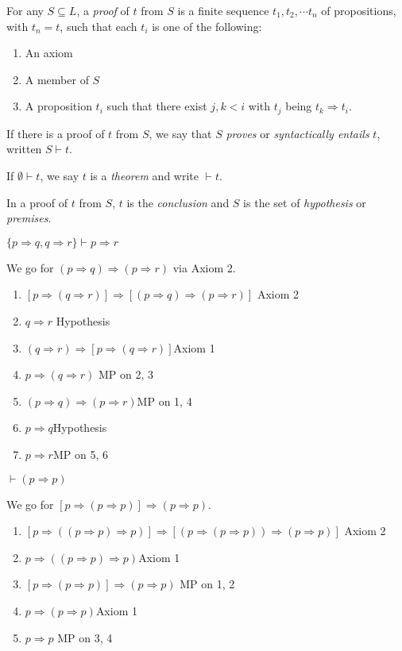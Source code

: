 \documentclass[a4paper]{article}
\begin{document}
\begin{defi}
  For any $S\subseteq L$, a \emph{proof} of $t$ from $S$ is a finite sequence $t_1, t_2, \cdots t_n$ of propositions, with $t_n = t$, such that each $t_i$ is one of the following:
\begin{enumerate}
  \item An axiom
  \item A member of $S$
  \item A proposition $t_i$ such that there exist $j, k < i$ with $t_j$ being $t_k\Rightarrow t_i$.
\end{enumerate}
If there is a proof of $t$ from $S$, we say that $S$ \emph{proves} or \emph{syntactically entails} $t$, written $S\vdash t$.

If $\emptyset \vdash t$, we say $t$ is a \emph{theorem} and write $\vdash t$.

In a proof of $t$ from $S$, $t$ is the \emph{conclusion} and $S$ is the set of \emph{hypothesis} or \emph{premises}.

\end{defi}
\begin{eg}
  $\{p\Rightarrow q, q\Rightarrow r\} \vdash p\Rightarrow r$

  We go for $(p\Rightarrow  q)\Rightarrow  (p\Rightarrow  r)$ via Axiom 2.
  \begin{enumerate}[label=\arabic{*}.]
    \item $[p\Rightarrow (q\Rightarrow r)]\Rightarrow [(p\Rightarrow q) \Rightarrow (p\Rightarrow r)]$ \hfill Axiom 2
    \item $q\Rightarrow r$ \hfill Hypothesis
    \item $(q\Rightarrow r)\Rightarrow [p\Rightarrow (q\Rightarrow r)]$\hfill Axiom 1
    \item $p\Rightarrow (q\Rightarrow r)$ \hfill MP on 2, 3
    \item $(p\Rightarrow q)\Rightarrow (p\Rightarrow r)$\hfill MP on 1, 4
    \item $p\Rightarrow q$\hfill Hypothesis
    \item $p\Rightarrow r$\hfill MP on 5, 6
  \end{enumerate}
\end{eg}

\begin{eg}
  $\vdash (p\Rightarrow p)$

  We go for $[p\Rightarrow (p\Rightarrow p)]\Rightarrow (p\Rightarrow p)$.
  \begin{enumerate}[label=\arabic{*}.]
    \item $[p\Rightarrow ((p\Rightarrow p)\Rightarrow p)]\Rightarrow [(p\Rightarrow (p\Rightarrow p))\Rightarrow (p\Rightarrow p)]$ \hfill Axiom 2
    \item $p\Rightarrow ( (p\Rightarrow p)\Rightarrow p)$\hfill Axiom 1
    \item $[p\Rightarrow (p\Rightarrow p)]\Rightarrow (p\Rightarrow p)$ \hfill MP on 1, 2
    \item $p\Rightarrow (p\Rightarrow p)$\hfill Axiom 1
    \item $p\Rightarrow p$ \hfill MP on 3, 4
  \end{enumerate}
\end{eg}
\end{document}
